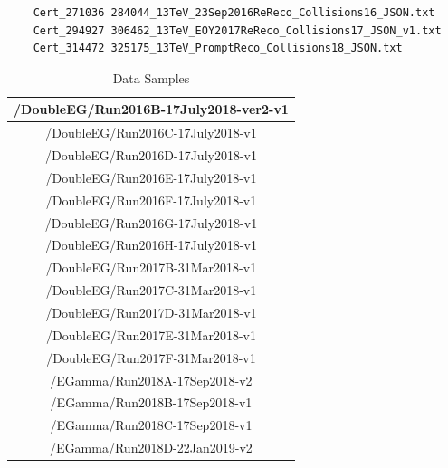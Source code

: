 \begin{verbatim}
	Cert_271036 284044_13TeV_23Sep2016ReReco_Collisions16_JSON.txt
	Cert_294927 306462_13TeV_EOY2017ReReco_Collisions17_JSON_v1.txt 
	Cert_314472 325175_13TeV_PromptReco_Collisions18_JSON.txt 
\end{verbatim} 

\begin{table}[h!]
	\centering
	\caption{Data Samples}
	\begin{tabular}{|c|}
		\hline
		/DoubleEG/Run2016B-17July2018-ver2-v1 \\
		\hline
		/DoubleEG/Run2016C-17July2018-v1 \\
		\hline
		/DoubleEG/Run2016D-17July2018-v1 \\
		\hline
		/DoubleEG/Run2016E-17July2018-v1 \\
		\hline
		/DoubleEG/Run2016F-17July2018-v1 \\
		\hline
		/DoubleEG/Run2016G-17July2018-v1 \\
		\hline
		/DoubleEG/Run2016H-17July2018-v1 \\
		\hline
		/DoubleEG/Run2017B-31Mar2018-v1 \\
		\hline
		/DoubleEG/Run2017C-31Mar2018-v1 \\
		\hline
		/DoubleEG/Run2017D-31Mar2018-v1 \\
		\hline
		/DoubleEG/Run2017E-31Mar2018-v1 \\
		\hline
		/DoubleEG/Run2017F-31Mar2018-v1 \\
		\hline
		/EGamma/Run2018A-17Sep2018-v2 \\
		\hline
		/EGamma/Run2018B-17Sep2018-v1 \\
		\hline
		/EGamma/Run2018C-17Sep2018-v1 \\
		\hline
		/EGamma/Run2018D-22Jan2019-v2 \\
		\hline
	\end{tabular}
	\label{table:DataSamples}
\end{table}


